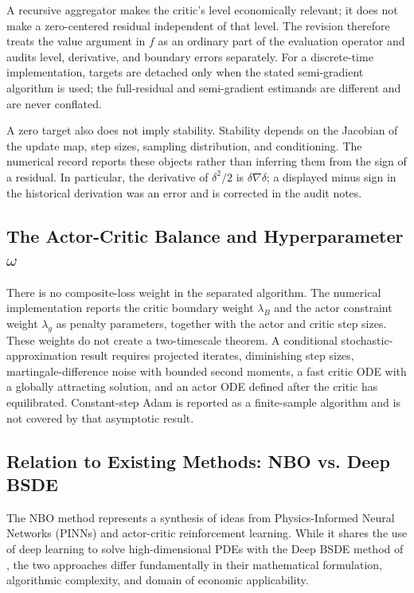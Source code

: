 \documentclass[ecta]{econsocart}
\theoremstyle{plain}
\theoremstyle{remark}
\begin{document}
A recursive aggregator makes the critic's level economically relevant; it does not make a zero-centered residual independent of that level. The revision therefore treats the value argument in $f$ as an ordinary part of the evaluation operator and audits level, derivative, and boundary errors separately. For a discrete-time implementation, targets are detached only when the stated semi-gradient algorithm is used; the full-residual and semi-gradient estimands are different and are never conflated.

A zero target also does not imply stability. Stability depends on the Jacobian of the update map, step sizes, sampling distribution, and conditioning. The numerical record reports these objects rather than inferring them from the sign of a residual. In particular, the derivative of $\delta^2/2$ is $\delta\nabla\delta$; a displayed minus sign in the historical derivation was an error and is corrected in the audit notes.

\subsection{The Actor-Critic Balance and Hyperparameter \texorpdfstring{$\omega$}{omega}}
There is no composite-loss weight in the separated algorithm. The numerical implementation reports the critic boundary weight $\lambda_B$ and the actor constraint weight $\lambda_g$ as penalty parameters, together with the actor and critic step sizes. These weights do not create a two-timescale theorem. A conditional stochastic-approximation result requires projected iterates, diminishing step sizes, martingale-difference noise with bounded second moments, a fast critic ODE with a globally attracting solution, and an actor ODE defined after the critic has equilibrated. Constant-step Adam is reported as a finite-sample algorithm and is not covered by that asymptotic result.

\subsection{Relation to Existing Methods: NBO vs. Deep BSDE}
\label{sec:relation_to_bsde}

The NBO method represents a synthesis of ideas from Physics-Informed Neural Networks (PINNs) and actor-critic reinforcement learning. While it shares the use of deep learning to solve high-dimensional PDEs with the Deep BSDE method of \cite{han2018solving}, the two approaches differ fundamentally in their mathematical formulation, algorithmic complexity, and domain of economic applicability.
\end{document}
